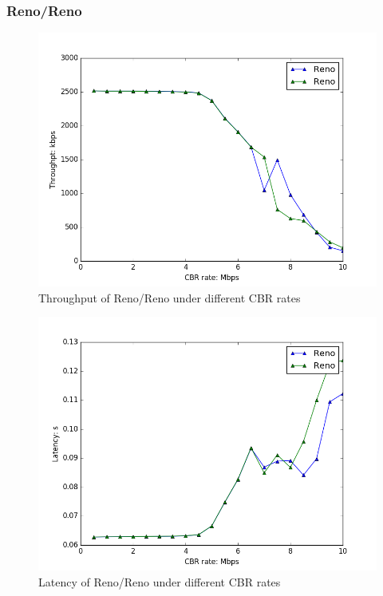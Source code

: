 \documentclass[10pt, conference]{IEEEtran/IEEEtran}
\begin{document}
\subsubsection{Reno/Reno}
\begin{figure}[!ht]
\begin{center}
\includegraphics[width=\linewidth]{../exp2/exp2_Reno_Reno_thpt.png}
\caption{Throughput of Reno/Reno under different CBR rates}
\label{exp2_Reno_Reno_thpt}
\end{center}
\end{figure}

\begin{figure}[!ht]
\begin{center}
\includegraphics[width=\linewidth]{../exp2/exp2_Reno_Reno_lat.png}
\caption{Latency of Reno/Reno under different CBR rates}
\label{exp2_Reno_Reno_lat}
\end{center}
\end{figure}
\end{document}
